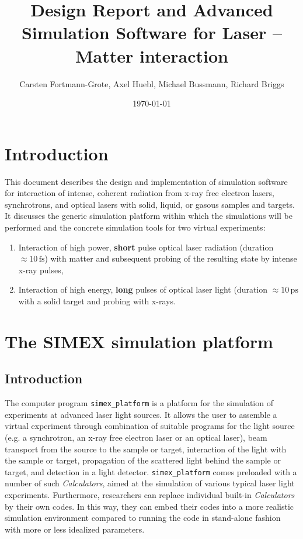 \documentclass[a4paper]{article}
\title{Design Report and Advanced Simulation Software for Laser -- Matter interaction}
\author{Carsten Fortmann-Grote, Axel Huebl, Michael Bussmann, Richard
Briggs} %
\date{\today}
\begin{document}
\maketitle
\section{Introduction}
This document describes the design and implementation of simulation software for interaction of intense, coherent radiation from x-ray free
electron lasers, synchrotrons, and optical lasers with solid, liquid, or gasous samples and targets.
It discusses the generic simulation platform within which the simulations will be performed and the
concrete simulation tools for two virtual experiments:
\begin{enumerate}
  \item Interaction of high power, \textbf{short} pulse optical laser radiation (duration $\approx 10\,\text{fs}$)
    with matter and subsequent probing of the resulting state by intense x-ray pulses,
  \item Interaction of high energy, \textbf{long} pulses of optical laser light (duration $\approx 10\,\text{ps}$
    with a solid target and probing with x-rays.
\end{enumerate}%

\section{The SIMEX simulation platform \label{sec:simex_platform}}
%
\subsection{Introduction}
The computer program \texttt{simex\_platform}
\cite{simex_github}
is a platform for the simulation of experiments at advanced laser light sources. It allows the
user to assemble a virtual experiment through combination of suitable programs for the light source (e.g. a synchrotron, an x-ray free electron
laser or an optical laser), beam transport from the source to the sample or target, interaction of the light with the sample or target,
propagation of the scattered light behind the sample or target, and detection in a light detector. \texttt{simex\_platform} comes preloaded with
a number of such \textit{Calculators}, aimed at the simulation of various typical laser light experiments. Furthermore, researchers
can replace individual built-in \textit{Calculators} by their own codes. In this way, they can embed their codes
into a more realistic simulation environment compared to running the code in stand-alone fashion with more or less idealized parameters.
%
\end{document}
